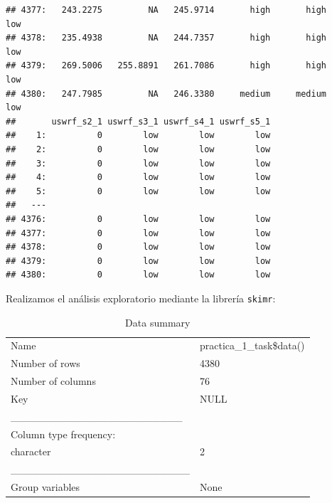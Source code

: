 \documentclass[
  11pt,
  a4paper,
]{article}
\newenvironment{Shaded}{\begin{snugshade}}{\end{snugshade}}
\newcommand{\FunctionTok}[1]{\textcolor[rgb]{0.00,0.00,0.00}{#1}}
\newcommand{\NormalTok}[1]{#1}
\newcommand{\OtherTok}[1]{\textcolor[rgb]{0.56,0.35,0.01}{#1}}
\newcommand{\SpecialCharTok}[1]{\textcolor[rgb]{0.00,0.00,0.00}{#1}}
\newcommand{\StringTok}[1]{\textcolor[rgb]{0.31,0.60,0.02}{#1}}
\begin{document}
\begin{verbatim}
## 4377:   243.2275         NA   245.9714       high       high        low
## 4378:   235.4938         NA   244.7357       high       high        low
## 4379:   269.5006   255.8891   261.7086       high       high        low
## 4380:   247.7985         NA   246.3380     medium     medium        low
##       uswrf_s2_1 uswrf_s3_1 uswrf_s4_1 uswrf_s5_1
##    1:          0        low        low        low
##    2:          0        low        low        low
##    3:          0        low        low        low
##    4:          0        low        low        low
##    5:          0        low        low        low
##   ---                                            
## 4376:          0        low        low        low
## 4377:          0        low        low        low
## 4378:          0        low        low        low
## 4379:          0        low        low        low
## 4380:          0        low        low        low
\end{verbatim}

Realizamos el análisis exploratorio mediante la librería \texttt{skimr}:

\begin{Shaded}
\end{Shaded}

\begin{longtable}[]{@{}ll@{}}
\caption{Data summary}\tabularnewline
\toprule()
\endhead
Name & practica\_1\_task\$data() \\
Number of rows & 4380 \\
Number of columns & 76 \\
Key & NULL \\
\_\_\_\_\_\_\_\_\_\_\_\_\_\_\_\_\_\_\_\_\_\_\_ & \\
Column type frequency: & \\
character & 2 \\
\_\_\_\_\_\_\_\_\_\_\_\_\_\_\_\_\_\_\_\_\_\_\_\_ & \\
Group variables & None \\
\bottomrule()
\end{longtable}
\end{document}
